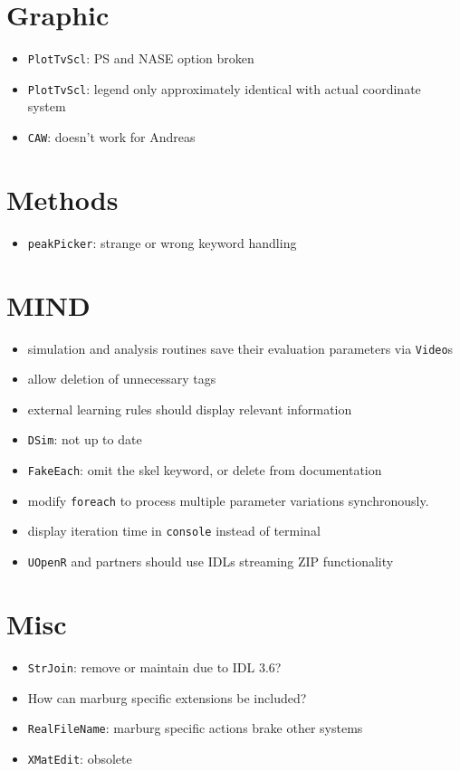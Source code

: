 \documentclass[12pt]{article}
\begin{document}
\section{Graphic}
\begin{itemize}
\item \texttt{PlotTvScl}: PS and NASE option broken
\item \texttt{PlotTvScl}: legend only approximately identical with actual coordinate system
\item \texttt{CAW}: doesn't work for Andreas
\end{itemize}


\section{Methods}
\begin{itemize}
\item \texttt{peakPicker}: strange or wrong keyword handling
\end{itemize}


\section{MIND}

\begin{itemize}
\item simulation and analysis routines save their evaluation parameters via \texttt{Video}s
\item allow deletion of unnecessary tags
\item external learning rules should display relevant information
\item \texttt{DSim}: not up to date
\item \texttt{FakeEach}: omit the skel keyword, or delete from documentation
\item modify \texttt{foreach} to process multiple parameter variations synchronously. 
\item display iteration time in \texttt{console} instead of terminal
\item \texttt{UOpenR} and partners should use IDLs streaming ZIP functionality
\end{itemize}



\section{Misc}
\begin{itemize}
\item \texttt{StrJoin}: remove or maintain due to IDL 3.6?
\item How can marburg specific extensions be included?
\item \texttt{RealFileName}: marburg specific actions brake other systems
\item \texttt{XMatEdit}: obsolete 
\end{itemize}
\end{document}
